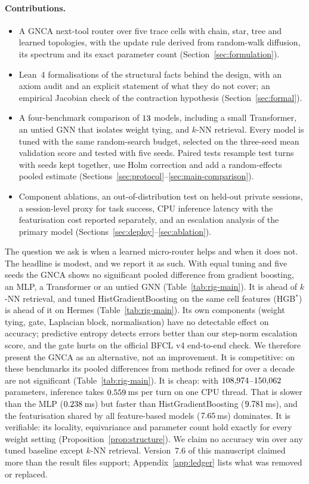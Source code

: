 \documentclass[10pt,twocolumn,letterpaper]{article}
\begin{document}
\paragraph{Contributions.}
\begin{itemize}[leftmargin=1.2em, itemsep=0.1em]
  \item A GNCA next-tool router over five trace cells with chain, star, tree and learned topologies, with the update rule derived from random-walk diffusion, its spectrum and its exact parameter count (Section~\ref{sec:formulation}).
  \item Lean~4 formalisations of the structural facts behind the design, with an axiom audit and an explicit statement of what they do not cover; an empirical Jacobian check of the contraction hypothesis (Section~\ref{sec:formal}).
  \item A four-benchmark comparison of $13$ models, including a small Transformer, an untied GNN that isolates weight tying, and $k$-NN retrieval. Every model is tuned with the same random-search budget, selected on the three-seed mean validation score and tested with five seeds. Paired tests resample test turns with seeds kept together, use Holm correction and add a random-effects pooled estimate (Sections~\ref{sec:protocol}--\ref{sec:main-comparison}).
  \item Component ablations, an out-of-distribution test on held-out private sessions, a session-level proxy for task success, CPU inference latency with the featurisation cost reported separately, and an escalation analysis of the primary model (Sections~\ref{sec:deploy}--\ref{sec:ablation}).
\end{itemize}
The question we ask is when a learned micro-router helps and when it does not. The headline is modest, and we report it as such. With equal tuning and five seeds the GNCA shows no significant pooled difference from gradient boosting, an MLP, a Transformer or an untied GNN (Table~\ref{tab:rig-main}). It is ahead of $k$-NN retrieval, and tuned HistGradientBoosting on the same cell features (HGB$^\ast$) is ahead of it on Hermes (Table~\ref{tab:rig-main}). Its own components (weight tying, gate, Laplacian block, normalisation) have no detectable effect on accuracy; predictive entropy detects errors better than our step-norm escalation score, and the gate hurts on the official BFCL v4 end-to-end check. We therefore present the GNCA as an alternative, not an improvement. It is competitive: on these benchmarks its pooled differences from methods refined for over a decade are not significant (Table~\ref{tab:rig-main}). It is cheap: with $108{,}974$--$150{,}062$ parameters, inference takes $0.559$\,ms per turn on one CPU thread. That is slower than the MLP ($0.238$\,ms) but faster than HistGradientBoosting ($9.781$\,ms), and the featurisation shared by all feature-based models ($7.65$\,ms) dominates. It is verifiable: its locality, equivariance and parameter count hold exactly for every weight setting (Proposition~\ref{prop:structure}). We claim no accuracy win over any tuned baseline except $k$-NN retrieval. Version~7.6 of this manuscript claimed more than the result files support; Appendix~\ref{app:ledger} lists what was removed or replaced.
\end{document}
